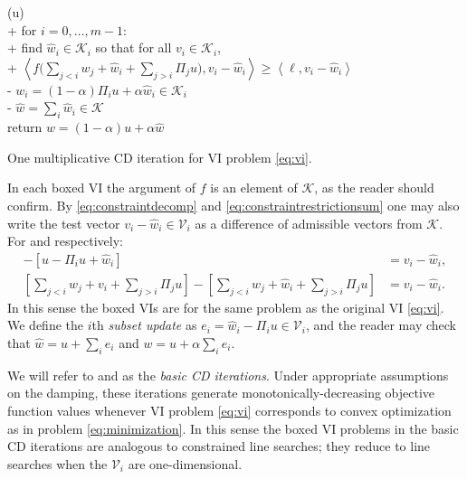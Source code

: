 \documentclass[letterpaper,final,12pt,reqno]{amsart}
\theoremstyle{cstyle}
\theoremstyle{cstyle*}
\theoremstyle{dstyle}
\numberwithin{equation}{section}
\numberwithin{figure}{section}
\numberwithin{table}{section}
\numberwithin{theorem}{section}
\newcommand{\cK}{\mathcal{K}}
\newcommand{\cV}{\mathcal{V}}
\newcommand{\ip}[2]{\left<#1,#2\right>}
\begin{document}
\begin{pseudofloat}
\begin{pseudo*}
(u)\text{:} \\+
    for $i = 0,\dots,m-1$: \\+
        \rm{find} $\hat w_i\in \cK_i$ \rm{so that for all} $v_i\in \cK_i$, \\+
            $\displaystyle \boxed{\ip{f\Big(\sum_{j<i} w_j + \hat w_i + \sum_{j>i} \Pi_j u\Big)}{v_i-\hat w_i} \ge \ip{\ell}{v_i-\hat w_i}}$ \\-
            $w_i = (1-\alpha) \Pi_i u + \alpha \hat w_i\in\cK_i$ \\-
    $\hat w = \sum_i \hat w_i\in\cK$ \\
    return $w=(1-\alpha) u + \alpha \hat w$
\end{pseudo*}
\caption{One multiplicative CD iteration for VI problem \eqref{eq:vi}.}
\label{alg:basiccd-mult}
\end{pseudofloat}

In each boxed VI the argument of $f$ is an element of $\cK$, as the reader should confirm.  By \eqref{eq:constraintdecomp} and \eqref{eq:constraintrestrictionsum} one may also write the test vector $v_i - \hat w_i \in \cV_i$ as a difference of admissible vectors from $\cK$.  For  and  respectively:
\begin{align}
[u - \Pi_i u + v_i] - [u - \Pi_i u + \hat w_i] &= v_i - \hat w_i, \label{eq:admissibledifferenceadd} \\
\left[\sum_{j<i} w_j + v_i + \sum_{j>i} \Pi_j u\right] - \left[\sum_{j<i} w_j + \hat w_i + \sum_{j>i} \Pi_j u\right] &= v_i - \hat w_i.  \label{eq:admissibledifferencemult}
\end{align}
In this sense the boxed VIs are for the same problem as the original VI \eqref{eq:vi}.  We define the $i$th \emph{subset update} as $e_i = \hat w_i - \Pi_i u \in \cV_i$, and the reader may check that $\hat w = u + \sum_{i} e_i$ and $w = u + \alpha \sum_i e_i$.

We will refer to  and  as the \emph{basic CD iterations}.  Under appropriate assumptions on the damping, these iterations generate monotonically-decreasing objective function values whenever VI problem \eqref{eq:vi} corresponds to convex optimization as in problem \eqref{eq:minimization}.  In this sense the boxed VI problems in the basic CD iterations are analogous to constrained line searches; they reduce to line searches when the $\cV_i$ are one-dimensional.
\end{document}
